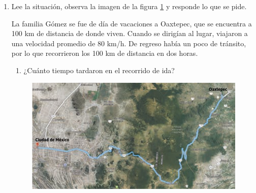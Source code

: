 \documentclass[11pt]{book}
\begin{document}
\begin{enumerate}
  \item Lee la situación, observa la imagen de la figura \ref{fig:mapa} y responde lo que se pide.\\
        \begin{minipage}[c][5cm][t]{.3\textwidth}
          La familia Gómez se fue de día de vacaciones a Oaxtepec, que se encuentra a 100 km de distancia de donde viven. Cuando se dirigían al lugar, viajaron a una velocidad promedio de 80 km/h.
          De regreso había un poco de tránsito, por lo que recorrieron los 100 km de distancia en dos horas.
          \begin{enumerate}
            \item ¿Cuánto tiempo tardaron en el recorrido de ida?\\[0.2cm]
          \end{enumerate}
        \end{minipage}\hfill
        \begin{minipage}[c][5cm][t]{.6\textwidth}
          \begin{figure}[H]
            \centering
            \includegraphics[width=\linewidth]{mapa}
            \label{fig:mapa}
          \end{figure}
        \end{minipage}


\end{enumerate}
\end{document}
